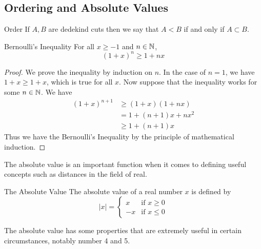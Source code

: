 \documentclass[a4paper]{article}
\begin{document}
\subsection{Ordering and Absolute Values}
\begin{defn}{Order}{} If $A,B$ are dedekind cuts then we say that $A<B$ if and only if $A\subset B$. 
\end{defn}

\begin{thm}{Bernoulli's Inequality}{} For all $x\geq-1$ and $n\in\mathbb{N}$, $$(1+x)^n\geq1+nx$$
\begin{proof} We prove the inequality by induction on $n$. In the case of $n=1$, we have $1+x\geq1+x$, which is true for all $x$. Now suppose that the inequality works for some $n\in\mathbb{N}$. We have 
\begin{align*}
(1+x)^{n+1}&\geq(1+x)(1+nx) \tag{Induction Hypothesis and $x\geq-1$} \\
&=1+(n+1)x+nx^2 \\
&\geq1+(n+1)x \tag{since $x^2\geq0$}
\end{align*}
Thus we have the Bernoulli's Inequality by the principle of mathematical induction. 
\end{proof}
\end{thm}

The absolute value is an important function when it comes to defining useful concepts such as distances in the field of real. 

\begin{defn}{The Absolute Value}{} The absolute value of a real number $x$ is defined by
$$|x|=\begin{cases}
x & \text{if $x\geq0$} \\
-x & \text{if $x\leq0$}
\end{cases}$$
\end{defn}

The absolute value has some properties that are extremely useful in certain circumstances, notably number 4 and 5. 
\end{document}
